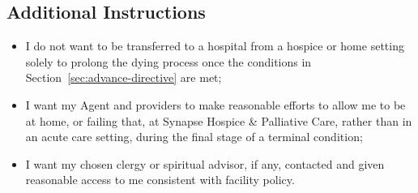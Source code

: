 \subsection{Additional Instructions}
\begin{itemize}[label=\textbullet,leftmargin=1.4em,itemsep=2pt,topsep=2pt]
\item I do not want to be transferred to a hospital from a hospice or home setting solely to prolong the dying process once the conditions in Section~\ref{sec:advance-directive} are met;
\item I want my Agent and providers to make reasonable efforts to allow me to be at home, or failing that, at Synapse Hospice \& Palliative Care, rather than in an acute care setting, during the final stage of a terminal condition;
\item I want my chosen clergy or spiritual advisor, if any, contacted and given reasonable access to me consistent with facility policy.
\end{itemize}
